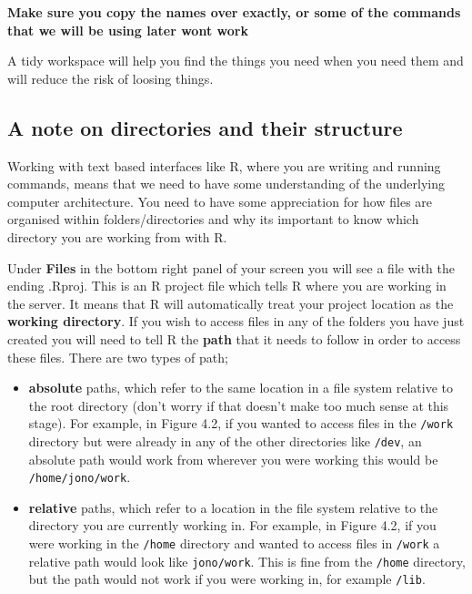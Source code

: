 \documentclass[
]{book}
\providecommand{\tightlist}{%
  \setlength{\itemsep}{0pt}\setlength{\parskip}{0pt}}
\begin{document}
\textbf{Make sure you copy the names over exactly, or some of the commands that we will be using later wont work}

A tidy workspace will help you find the things you need when you need them and will reduce the risk of loosing things.

\hypertarget{a-note-on-directories-and-their-structure}{%
\subsection{A note on directories and their structure}\label{a-note-on-directories-and-their-structure}}

Working with text based interfaces like R, where you are writing and running commands, means that we need to have some understanding of the underlying computer architecture. You need to have some appreciation for how files are organised within folders/directories and why its important to know which directory you are working from with R.

Under \textbf{Files} in the bottom right panel of your screen you will see a file with the ending .Rproj. This is an R project file which tells R where you are working in the server. It means that R will automatically treat your project location as the \textbf{working directory}. If you wish to access files in any of the folders you have just created you will need to tell R the \textbf{path} that it needs to follow in order to access these files. There are two types of path;

\begin{itemize}
\tightlist
\item
  \textbf{absolute} paths, which refer to the same location in a file system relative to the root directory (don't worry if that doesn't make too much sense at this stage). For example, in Figure 4.2, if you wanted to access files in the \texttt{/work} directory but were already in any of the other directories like \texttt{/dev}, an absolute path would work from wherever you were working this would be \texttt{/home/jono/work}.
\item
  \textbf{relative} paths, which refer to a location in the file system relative to the directory you are currently working in. For example, in Figure 4.2, if you were working in the \texttt{/home} directory and wanted to access files in \texttt{/work} a relative path would look like \texttt{jono/work}. This is fine from the \texttt{/home} directory, but the path would not work if you were working in, for example \texttt{/lib}.
\end{itemize}
\end{document}

